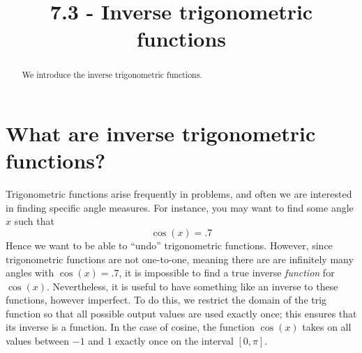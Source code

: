 \documentclass{ximera}
\title{7.3 - Inverse trigonometric functions}
\begin{document}
\begin{abstract}
  We introduce the inverse trigonometric functions.
\end{abstract}
\maketitle


\section{What are inverse trigonometric functions?}


Trigonometric functions arise frequently in problems, and often we are
interested in finding specific angle measures. For instance, you may
want to find some angle $x$ such that
\[
\cos(x) = .7
\]
Hence we want to be able to ``undo'' trigonometric functions. However, since
trigonometric functions are not one-to-one, meaning there are are
infinitely many angles with $\cos(x) = .7$, it is impossible to
find a true inverse \emph{function} for $\cos(x)$. Nevertheless, it is
useful to have something like an inverse to these functions, however
imperfect. To do this, we restrict the domain of the trig function so that all possible output values are used exactly once; this ensures that its inverse is a function. In the case of cosine, the function $\cos(x)$ takes on all
values between $-1$ and $1$ exactly once on the interval $[0,\pi]$.

\end{document}
